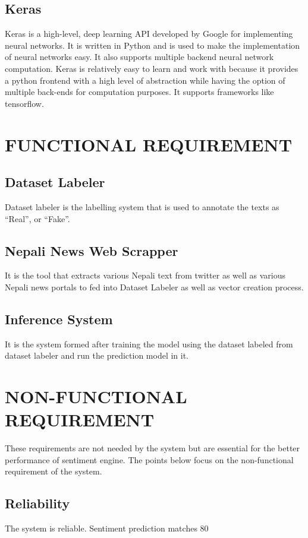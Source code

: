             \subsection{Keras}
                Keras is a high-level, deep learning API developed by Google for implementing neural networks. It is written in Python and is used to make the implementation of neural networks easy. It also supports multiple backend neural network computation. Keras is relatively easy to learn and work with because it provides a python frontend with a high level of abstraction while having the option of multiple back-ends for computation purposes. It supports frameworks like tensorflow.
                
        \section{FUNCTIONAL REQUIREMENT}
            \subsection{Dataset Labeler}
                Dataset labeler is the labelling system that is used to annotate the texts as “Real”, or “Fake”.
            \subsection{Nepali News Web Scrapper}
It is the tool that extracts various Nepali text from twitter as well as various Nepali news
portals to fed into Dataset Labeler as well as vector creation process.
            \subsection{Inference System}
It is the system formed after training the model using the dataset labeled from dataset
labeler and run the prediction model in it.
        \section{NON-FUNCTIONAL REQUIREMENT}
These requirements are not needed by the system but are essential for the better
performance of sentiment engine. The points below focus on the non-functional
requirement of the system.
            \subsection{Reliability}
The system is reliable. Sentiment prediction matches 80%
